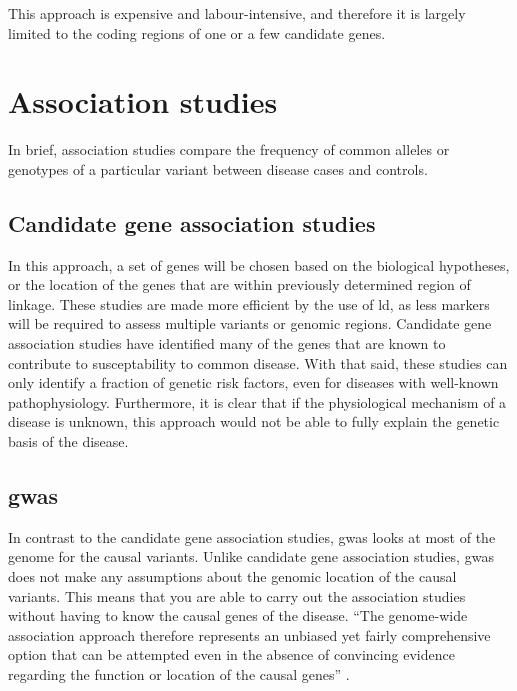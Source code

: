 This approach is expensive and labour-intensive, and therefore it is largely limited to the coding regions of one or a few candidate genes.

\section{Association studies}
\label{sec:association_studies}

In brief, association studies compare the frequency of common alleles or genotypes of  a particular variant between disease cases and controls.

\subsection{Candidate gene association studies}
\label{sub:candidate_gene_association_studies}

In this approach, a set of genes will be chosen based on the biological hypotheses, or the location of the genes that are within previously determined region of linkage.
These studies are made more efficient by the use of \gls{ld}, as less markers will be required to assess multiple variants or genomic regions.
Candidate gene association studies have identified many of the genes that are known to contribute to susceptability to common disease.
With that said, these studies can only identify  a fraction of genetic risk factors, even for diseases with well-known pathophysiology.
Furthermore, it is clear that if the physiological mechanism of a disease is unknown, this approach would not be able to fully explain the genetic basis of the disease.

\subsection{\Acrfull{gwas}}
\label{sub:gwas}

In contrast to the candidate gene association studies, \gls{gwas} looks at most of the genome for the causal variants.
Unlike candidate gene association studies, \gls{gwas} does not make any assumptions about the genomic location of the causal variants.
This means that you are able to carry out the association studies without having to know the causal genes of the disease.
``The genome-wide association approach therefore represents an unbiased yet fairly comprehensive option that can be attempted even in the absence of convincing evidence regarding the function or location of the causal genes'' \citep{Hirschhorn2005}.


